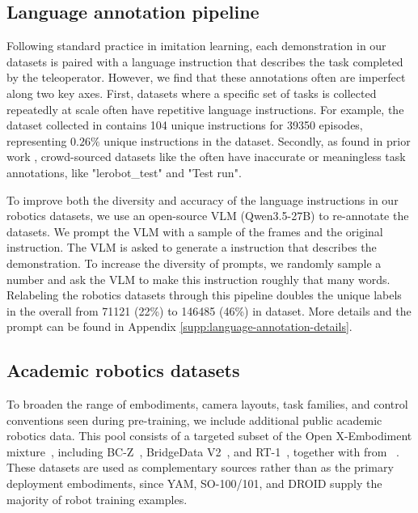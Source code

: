 \subsection{Language annotation pipeline}
\label{sec:lang_annot}
Following standard practice in imitation learning, each demonstration in our datasets is paired with a language instruction that describes the task completed by the teleoperator. However, we find that these annotations often are imperfect along two key axes. First, datasets where a specific set of tasks is collected repeatedly at scale often have repetitive language instructions. For example, the dataset collected in \cite{jang2022bc} contains 104 unique instructions for 39350 episodes, representing $0.26\%$ unique instructions in the dataset. Secondly, as found in prior work \citep{shukor2025smolvlavisionlanguageactionmodelaffordable}, crowd-sourced datasets like the \molmoacttsodata often have inaccurate or meaningless task annotations, like "lerobot\_test" and "Test run".

To improve both the diversity and accuracy of the language instructions in our robotics datasets, we use an open-source VLM (Qwen3.5-27B) to re-annotate the datasets. We prompt the VLM with a sample of the frames and the original instruction. The VLM is asked to generate a instruction that describes the demonstration. To increase the diversity of prompts, we randomly sample a number and ask the VLM to make this instruction roughly that many words. Relabeling the robotics datasets through this pipeline doubles the unique labels in the overall from 71121 (22\%) to 146485 (46\%) in dataset. More details and the prompt can be found in Appendix \ref{supp:language-annotation-details}.


\subsection{Academic robotics datasets}
To broaden the range of embodiments, camera layouts, task families, and control conventions seen during pre-training, we include additional public academic robotics data. This pool consists of a targeted subset of the Open X-Embodiment mixture~\citep{o2024open}, including BC-Z~\citep{jang2022bc}, BridgeData V2~\citep{walke2023bridgedata},
and RT-1~\citep{brohan2022rt}, together with \molmoactdata from \molmoact~\citep{lee2025molmoactactionreasoningmodels}. These datasets are used as complementary sources rather than as the primary deployment embodiments, since YAM, SO-100/101, and DROID supply the majority of robot training examples.

